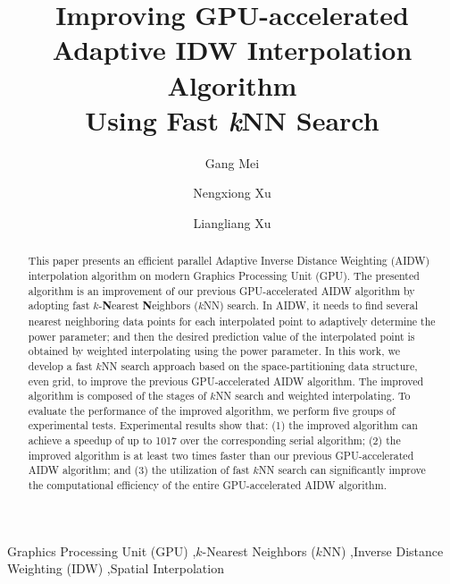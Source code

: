 \documentclass[final,5p,times,twocolumn,authoryear]{elsarticle}
\begin{document}
\begin{frontmatter}






\title{Improving GPU-accelerated Adaptive IDW Interpolation Algorithm \\Using 
	   Fast \textit{k}NN Search}



\author[myaddress]{Gang Mei}
\author[myaddress]{Nengxiong Xu}
\author[myaddress]{Liangliang Xu}
\address[myaddress]{School of Engineering and Technology, China University of Geosciences, Beijing 100083, China}


\begin{abstract}
This paper presents an efficient parallel Adaptive Inverse Distance 
Weighting (AIDW) interpolation algorithm on modern Graphics Processing Unit 
(GPU). The presented algorithm is an improvement of our previous 
GPU-accelerated AIDW algorithm by adopting fast $k$-\textbf{N}earest 
\textbf{N}eighbors ($k$NN) search. In AIDW, it needs to find several nearest 
neighboring data points for each interpolated point to adaptively determine 
the power parameter; and then the desired prediction value of the interpolated point 
is obtained by weighted interpolating using the power parameter. In this 
work, we develop a fast $k$NN search approach based on the space-partitioning 
data structure, even grid, to improve the previous GPU-accelerated AIDW algorithm. 
The improved algorithm is composed of the stages of $k$NN search and weighted 
interpolating. To evaluate the performance of the improved algorithm, we 
perform five groups of experimental tests. Experimental results show that: 
(1) the improved algorithm can achieve a speedup of up to 1017 over the 
corresponding serial algorithm; (2) the improved algorithm is at least two 
times faster than our previous GPU-accelerated AIDW algorithm; and (3) the utilization 
of fast $k$NN search can significantly improve the computational efficiency of 
the entire GPU-accelerated AIDW algorithm.
\end{abstract}

\begin{keyword}
Graphics Processing Unit (GPU) \sep $k$-Nearest Neighbors 
($k$NN) \sep Inverse Distance Weighting (IDW) \sep Spatial Interpolation






\end{keyword}


\end{frontmatter}
\end{document}
